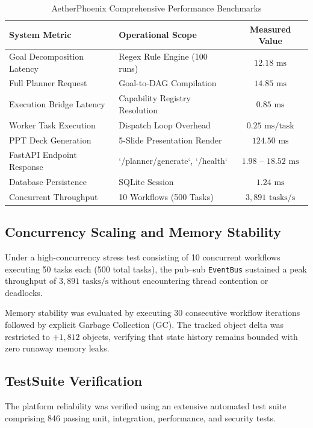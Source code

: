 \documentclass[conference]{IEEEtran}
\begin{document}
\begin{table}[htbp]
\caption{AetherPhoenix Comprehensive Performance Benchmarks}
\label{tab:aether_performance}
\centering
\begin{tabular}{p{3.2cm} p{3.2cm} c}
\toprule
\textbf{System Metric} & \textbf{Operational Scope} & \textbf{Measured Value} \\
\midrule
Goal Decomposition Latency & Regex Rule Engine (100 runs) & $12.18\text{ ms}$ \\
Full Planner Request & Goal-to-DAG Compilation & $14.85\text{ ms}$ \\
Execution Bridge Latency & Capability Registry Resolution & $0.85\text{ ms}$ \\
Worker Task Execution & Dispatch Loop Overhead & $0.25\text{ ms/task}$ \\
PPT Deck Generation & 5-Slide Presentation Render & $124.50\text{ ms}$ \\
FastAPI Endpoint Response & `/planner/generate`, `/health` & $1.98\text{ -- }18.52\text{ ms}$ \\
Database Persistence & SQLite Session & $1.24\text{ ms}$ \\
Concurrent Throughput & 10 Workflows (500 Tasks) & $3,891\text{ tasks/s}$ \\
\bottomrule
\end{tabular}
\end{table}

\subsection{Concurrency Scaling and Memory Stability}
Under a high-concurrency stress test consisting of 10 concurrent workflows executing 50 tasks each (500 total tasks), the pub--sub \texttt{EventBus} sustained a peak throughput of $3,891\text{ tasks/s}$ without encountering thread contention or deadlocks.

Memory stability was evaluated by executing 30 consecutive workflow iterations followed by explicit Garbage Collection (GC). The tracked object delta was restricted to $+1,812$ objects, verifying that state history remains bounded with zero runaway memory leaks.

\subsection{TestSuite Verification}
The platform reliability was verified using an extensive automated test suite comprising 846 passing unit, integration, performance, and security tests.
\end{document}
